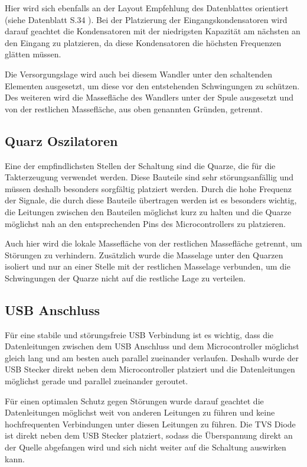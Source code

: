 Hier wird sich ebenfalls an der Layout Empfehlung des Datenblattes orientiert (siehe Datenblatt S.34 \cite{AP63203WU}). 
Bei der Platzierung der Eingangskondensatoren wird darauf geachtet die Kondensatoren mit der niedrigsten Kapazität am nächsten
an den Eingang zu platzieren, da diese Kondensatoren die höchsten Frequenzen glätten müssen.

Die Versorgungslage wird auch bei diesem Wandler unter den schaltenden Elementen ausgesetzt, um diese vor den entstehenden 
Schwingungen zu schützen. Des weiteren wird die Massefläche des Wandlers unter der Spule ausgesetzt und von der restlichen
Massefläche, aus oben genannten Gründen, getrennt.

\subsection{Quarz Oszilatoren}
Eine der empfindlichsten Stellen der Schaltung sind die Quarze, die für die Takterzeugung verwendet werden. Diese Bauteile
sind sehr störungsanfällig und müssen deshalb besonders sorgfältig platziert werden. Durch die hohe Frequenz
der Signale, die durch diese Bauteile übertragen werden ist es besonders wichtig, die Leitungen zwischen den Bauteilen
möglichst kurz zu halten und die Quarze möglichst nah an den entsprechenden Pins des Microcontrollers zu platzieren.

Auch hier wird die lokale Massefläche von der restlichen Massefläche getrennt, um Störungen zu
verhindern. Zusätzlich wurde die Masselage unter den Quarzen isoliert und nur an einer Stelle mit der restlichen Masselage
verbunden, um die Schwingungen der Quarze nicht auf die restliche Lage zu verteilen.

\subsection{\ac{USB} Anschluss}
Für eine stabile und störungsfreie \ac{USB} Verbindung ist es wichtig, dass die Datenleitungen zwischen dem \ac{USB} Anschluss und
dem Microcontroller möglichst gleich lang und am besten auch parallel zueinander verlaufen. Deshalb wurde der \ac{USB} Stecker
direkt neben dem Microcontroller platziert und die Datenleitungen möglichst gerade und parallel zueinander geroutet.

Für einen optimalen Schutz gegen Störungen wurde darauf geachtet die Datenleitungen möglichst weit von anderen Leitungen zu führen
und keine hochfrequenten Verbindungen unter diesen Leitungen zu führen. Die TVS Diode ist direkt neben dem \ac{USB} Stecker platziert,
sodass die Überspannung direkt an der Quelle abgefangen wird und sich nicht weiter auf die Schaltung auswirken kann. 

